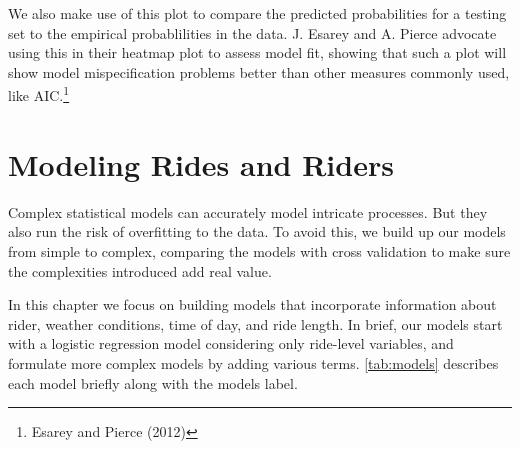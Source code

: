 \documentclass[12pt,twoside]{reedthesis}
\begin{document}
  We also make use of this plot to compare the predicted probabilities for
  a testing set to the empirical probablilities in the data. J. Esarey and
  A. Pierce advocate using this in their heatmap plot to assess model fit,
  showing that such a plot will show model mispecification problems better
  than other measures commonly used, like AIC.\footnote{Esarey and Pierce
    (2012)}
  
  \chapter{Modeling Rides and Riders}\label{modeling-rides-and-riders}
  
  Complex statistical models can accurately model intricate processes. But
  they also run the risk of overfitting to the data. To avoid this, we
  build up our models from simple to complex, comparing the models with
  cross validation to make sure the complexities introduced add real
  value.
  
  In this chapter we focus on building models that incorporate information
  about rider, weather conditions, time of day, and ride length. In brief,
  our models start with a logistic regression model considering only
  ride-level variables, and formulate more complex models by adding
  various terms. \autoref{tab:models} describes each model briefly along
  with the models label.
  
\end{document}
